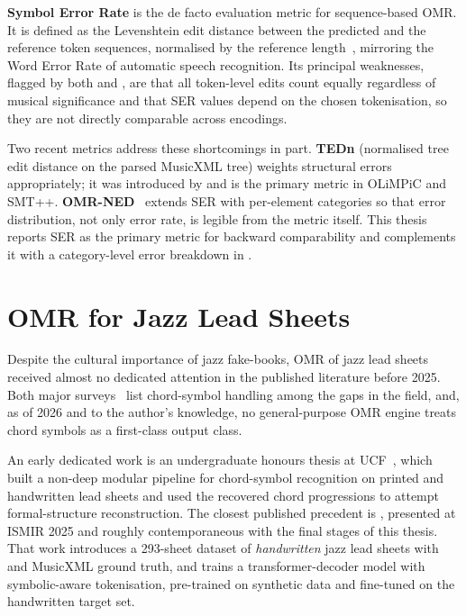 \textbf{Symbol Error Rate} is the de facto evaluation metric for
sequence-based OMR.
It is defined as the Levenshtein edit distance between the predicted and
the reference token sequences, normalised by the reference
length~\cite{levenshteinBinaryCodes1966}, mirroring the Word Error Rate of automatic
speech recognition.
Its principal weaknesses, flagged by both
\textcite{shatriOPTICALMUSICRECOGNITION} and
\textcite{hajicOMRMetricsEvaluation2019}, are that all token-level edits
count equally regardless of musical significance and that SER values
depend on the chosen tokenisation, so they are not directly comparable
across encodings.

Two recent metrics address these shortcomings in part.
\textbf{TEDn} (normalised tree edit distance on the parsed MusicXML tree)
weights structural errors appropriately; it was introduced by
\textcite{mayerPracticalEndToEnd2024} and is the primary metric in
OLiMPiC and SMT++.
\textbf{OMR-NED}~\cite{martinezSevillaOMRNED2025} extends SER with
per-element categories so that error distribution, not only error
rate, is legible from the metric itself.
This thesis reports SER as the primary metric for backward comparability
and complements it with a category-level error breakdown in
.

\section{OMR for Jazz Lead Sheets}
\label{sec:soa-jazz}

Despite the cultural importance of jazz fake-books, OMR of jazz lead sheets
received almost no dedicated attention in the published literature before
2025.
Both major surveys~\cite{calvoZaragozaUnderstandingOMR2020,shatriOPTICALMUSICRECOGNITION}
list chord-symbol handling among the gaps in the field, and, as of 2026
and to the author's knowledge, no general-purpose OMR engine treats chord
symbols as a first-class output class.

An early dedicated work is an undergraduate honours thesis at
UCF~\cite{reedHonorsLeadSheets2018}, which built a non-deep modular
pipeline for chord-symbol recognition on printed and handwritten lead
sheets and used the recovered chord progressions to attempt
formal-structure reconstruction.
The closest published precedent is
\textcite{martinezSevillaJazzLeadSheets2025},
presented at ISMIR 2025 and roughly contemporaneous with the final stages
of this thesis.
That work introduces a 293-sheet dataset of \textit{handwritten} jazz lead
sheets with  and MusicXML ground truth, and trains a
transformer-decoder model with symbolic-aware tokenisation, pre-trained on
synthetic data and fine-tuned on the handwritten target set.

